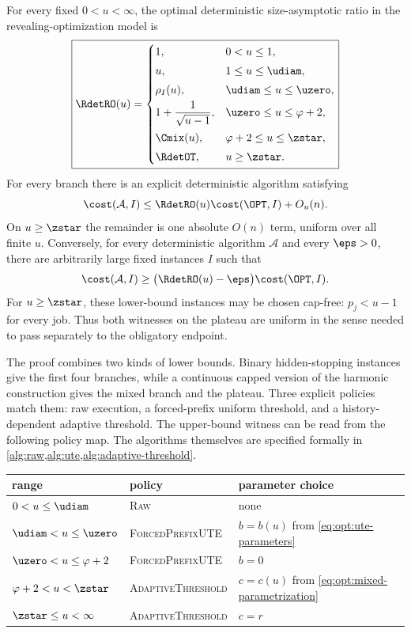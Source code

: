 \begin{theorem}
\label{thm:optional-curve}
For every fixed $0<u<\infty$, the optimal deterministic size-asymptotic ratio in
the revealing-optimization model is
\begin{equation}
\boxed{
\RdetRO(u)=
\begin{cases}
1, &0<u\le1,\\[1mm]
u, &1\le u\le \udiam,\\[1mm]
\rho_I(u), &\udiam\le u\le \uzero,\\[1mm]
\displaystyle 1+\frac1{\sqrt{u-1}},
   &\uzero\le u\le\varphi+2,\\[3mm]
\Cmix(u), &\varphi+2\le u\le \zstar,\\[1mm]
\RdetOT, &u\ge \zstar.
\end{cases}}
\label{eq:opt:full-curve}
\end{equation}
For every branch there is an explicit deterministic algorithm satisfying
\[
 \cost(\mathcal A,I)\le \RdetRO(u)\cost(\OPT,I)+O_u(n).
\]
On $u\ge \zstar$ the remainder is one absolute $O(n)$ term, uniform over all
finite $u$.
Conversely, for every deterministic algorithm $\mathcal A$ and every
$\eps>0$, there are arbitrarily large fixed instances $I$ such that
\[
 \cost(\mathcal A,I)
 \ge\bigl(\RdetRO(u)-\eps\bigr)\cost(\OPT,I).
\]
For $u\ge \zstar$, these lower-bound instances may be chosen cap-free:
$p_j<u-1$ for every job.  Thus both witnesses on the plateau are uniform in
the sense needed to pass separately to the obligatory endpoint.
\end{theorem}

The proof combines two kinds of lower bounds.  Binary hidden-stopping
instances give the first four branches, while a continuous capped version
of the harmonic construction gives the mixed branch and the plateau.  Three
explicit policies match them: raw execution, a forced-prefix uniform
threshold, and a history-dependent adaptive threshold.
The upper-bound witness can be read from the following policy map.  The
algorithms themselves are specified formally in
\cref{alg:raw,alg:ute,alg:adaptive-threshold}.
\begin{center}
\begin{tabular}{@{}lll@{}}
\toprule
range & policy & parameter choice \\
\midrule
$0<u\le \udiam$
 & \textsc{Raw} & none \\
$\udiam<u\le \uzero$
 & \textsc{ForcedPrefixUTE} & $b=b(u)$ from \eqref{eq:opt:ute-parameters} \\
$\uzero<u\le\varphi+2$
 & \textsc{ForcedPrefixUTE} & $b=0$ \\
$\varphi+2<u<\zstar$
 & \textsc{AdaptiveThreshold} & $c=c(u)$ from \eqref{eq:opt:mixed-parametrization} \\
$\zstar\le u<\infty$
 & \textsc{AdaptiveThreshold} & $c=r$ \\
\bottomrule
\end{tabular}
\end{center}


